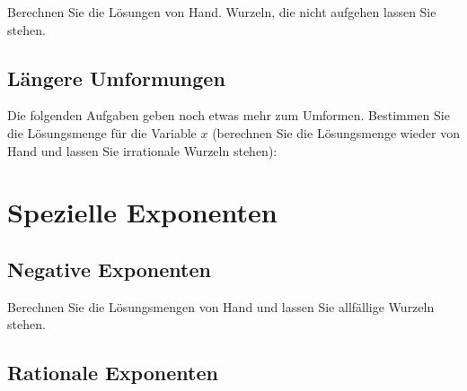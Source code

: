 Berechnen Sie die Lösungen von Hand. Wurzeln, die nicht aufgehen
lassen Sie stehen.





\noTRAINER{\newpage}

\subsection{Längere Umformungen}
Die folgenden Aufgaben geben noch etwas mehr zum Umformen. Bestimmen
Sie die Lösungsmenge für die Variable $x$ (berechnen Sie die
Lösungsmenge wieder von Hand und lassen Sie irrationale Wurzeln stehen):




\newpage
\section{Spezielle Exponenten}
\subsection{Negative Exponenten}

Berechnen Sie die Lösungsmengen von Hand und lassen Sie allfällige
Wurzeln stehen.


\noTRAINER{\newpage}
\subsection{Rationale Exponenten}




